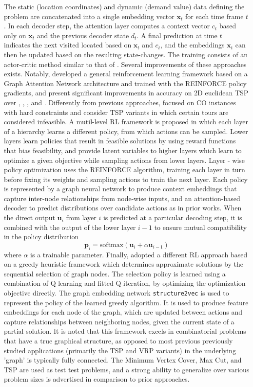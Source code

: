 The static (location coordinates) and dynamic (demand value) data defining the problem are concatenated into a single embedding vector $\bm{x}_t$ for each time frame $t$. In each decoder step, the attention layer computes a context vector $c_t$ based only on $\bm{x}_t$ and the previous decoder state $d_t$.  A final prediction at time $t$ indicates the next visited located based on $\bm{x}_t$ and $c_t$, and the embeddings $\bm{x}_t$ can then be updated based on the resulting state-changes. The training consists of an actor-critic method similar to that of .
Several improvements of these approaches exists. Notably, 
 developed a general reinforcement learning framework based on a Graph Attention Network architecture  and trained with the REINFORCE policy gradients, and present significant improvements in accuracy on 2D euclidean TSP  over , , , and . 
Differently from previous approaches,  
focused on CO instances with hard constraints and consider TSP variants in which certain tours are considered infeasible. 
A mutil-level RL framework is proposed in which each layer of a hierarchy learns a different policy, from which actions can be sampled. Lower layers learn policies that result in feasible solutions by using reward functions that bias feasibility, and provide latent variables to higher layers which learn to optimize a given objective while sampling actions from lower layers. Layer - wise policy optimization uses the REINFORCE algorithm, training each layer in turn before fixing its weights and sampling actions to train the next layer. Each policy is represented by a graph neural network to produce context embeddings that capture inter-node relationships from node-wise inputs, and an attention-based decoder to predict distributions over candidate actions as in prior works. When the direct output $\bm{u}_i$ from layer $i$ is predicted at a particular decoding step, it is combined with the output of the lower layer $i-1$ to ensure mutual compatibility in the policy distribution
$$  \bm{p}_i = \textrm{softmax}( \bm{u}_i + \alpha \bm{u}_{i-1} )  $$ where $\alpha$ is a trainable parameter. 
Finally,  adopted a different RL approach based on a greedy heuristic framework which determines approximate solutions by the sequential selection of graph nodes. The selection policy is learned using a combination of Q-learning and fitted Q-iteration, by optimizing the optimization objective directly. The graph embedding network \texttt{structure2vec} is used to represent the policy of the learned greedy algorithm. It is used to produce feature embeddings for each node of the graph, which are updated between actions and capture relationships between neighboring nodes, given the current state of a partial solution. It is noted that this framework excels in combinatorial problems that have a true graphical structure, as opposed to most previous previously studied applications (primarily the TSP and VRP variants) in the underlying 'graph' is typically fully connected. The Minimum Vertex Cover, Max Cut, and TSP are used as test test problems, and a strong ability to generalize over various problem sizes is advertised in comparison to prior approaches. 

